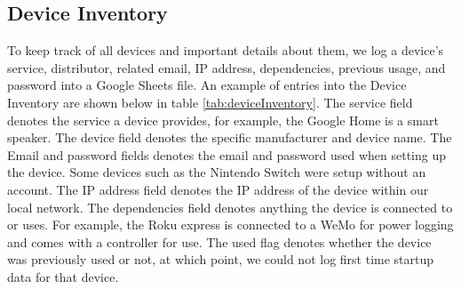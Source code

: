 \subsection{Device Inventory}
\label{Device Inventory}
To keep track of all devices and important details about them, we log a device's service, distributor, related email, IP address, dependencies, previous usage, and password into a Google Sheets file. An example of entries into the Device Inventory are shown below in table \ref{tab:deviceInventory}. The service field denotes the service a device provides, for example, the Google Home is a smart speaker. The device field denotes the specific manufacturer and device name. The Email and password fields denotes the email and password used when setting up the device. Some devices such as the Nintendo Switch were setup without an account. The IP address field denotes the IP address of the device within our local network. The dependencies field denotes anything the device is connected to or uses. For example, the Roku express is connected to a WeMo for power logging and comes with a controller for use. The used flag denotes whether the device was previously used or not, at which point, we could not log first time startup data for that device.

\begin{table}[H]
    \centering
    \caption{Device inventory excerpt. Password column not shown.}
    \label{tab:deviceInventory}
\end{table}

